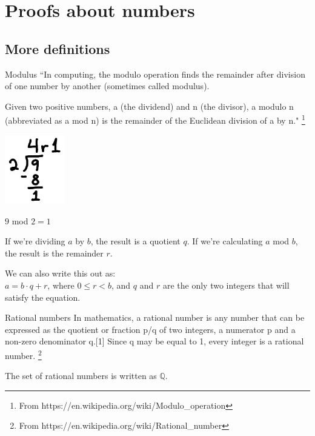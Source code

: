 \documentclass[../Template-Assignment.tex]{subfiles}
\begin{document}
    \newpage
    \section{Proofs about numbers}
   
    \subsection{More definitions}

        \begin{intro}{Modulus}
            ``In computing, the modulo operation finds the remainder after
            division of one number by another (sometimes called modulus).

            Given two positive numbers, a (the dividend) and n (the divisor),
            a modulo n (abbreviated as a mod n) is the remainder of the Euclidean division of a by n."
            \footnote{From https://en.wikipedia.org/wiki/Modulo\_operation}

            \begin{center}
                \includegraphics[height=3cm]{images/ch2-1-division.png}

                $9$ mod $2 = 1$
            \end{center}

            If we're dividing $a$ by $b$, the result is a quotient $q$.
            If we're calculating $a$ mod $b$, the result is the remainder $r$.

            \begin{center}
                We can also write this out as: \\
                $ a = b \cdot q + r $,
                where $0 \leq r < b$, and $q$ and $r$ are the only two integers
                that will satisfy the equation.
            \end{center}
        \end{intro}

        \begin{intro}{Rational numbers}
            In mathematics, a rational number is any number that can be
            expressed as the quotient or fraction p/q of two integers,
            a numerator p and a non-zero denominator q.[1] Since q may be equal to 1,
            every integer is a rational number.
            \footnote{From https://en.wikipedia.org/wiki/Rational\_number}

            The set of rational numbers is written as $\mathbb{Q}$.
        \end{intro}
\end{document}
